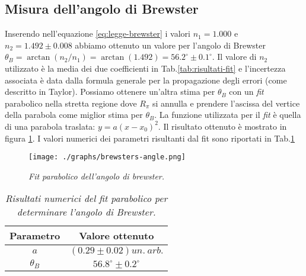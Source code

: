 \subsection{Misura dell'angolo di Brewster}\label{subsec:angolo-di-brewster}
  Inserendo nell'equazione \eqref{eq:legge-brewster} i valori $n_1 = 1.000$ e $n_2 = 1.492 \pm 0.008$
  abbiamo ottenuto un valore per l'angolo di Brewster $\theta_B = \arctan{(n_2 / n_1)} = \arctan{(1.492)} = 56.2^\circ \pm 0.1^\circ$. Il valore di $n_2$ utilizzato è la media
  dei due coefficienti in Tab.\ref{tab:risultati-fit} e l'incertezza associata è data dalla formula generale per la
  propagazione degli errori (come descritto in Taylor\cite{taylor99}).
  Possiamo ottenere un'altra stima per $\theta_B$ con un \emph{fit} parabolico nella stretta regione
  dove $R_\pi$ si annulla e prendere l'ascissa del vertice della parabola come miglior stima per $\theta_B$.
  La funzione utilizzata per il \emph{fit} è quella di una parabola traslata: $y = a(x - x_0)^2$.
  Il risultato ottenuto è mostrato in figura \ref{fig:brewsters-angle}. I valori numerici
  dei parametri risultanti dal fit sono riportati in Tab.\ref{tab:fit-brewster}
  \begin{figure}[h]
    \centering
    \texttt{[image: ./graphs/brewsters-angle.png]}
    \caption{
      \emph{
        Fit parabolico dell'angolo di brewster.
      }
    }
    \label{fig:brewsters-angle}
  \end{figure}
  \begin{table}[ht]
    \centering
    \begin{tabular}[t]{cc}
      \toprule
      Parametro &Valore ottenuto\\
      \midrule
      $a$ &$(0.29 \pm 0.02) un.\ arb.$ \\
      $\theta_B$ &$56.8^\circ \pm 0.2^\circ$ \\
      \bottomrule
      \end{tabular}
    \caption{
      \emph{
        Risultati numerici del \emph{fit} parabolico per determinare l'angolo di Brewster.
      }
    }
    \label{tab:fit-brewster}
  \end{table}
\endinput



